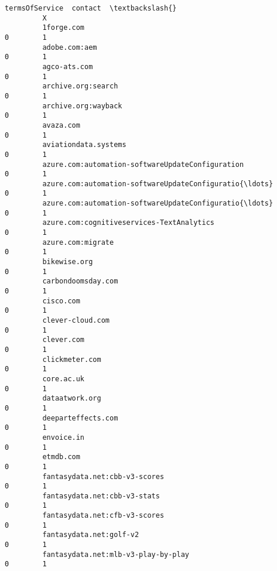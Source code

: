 \documentclass[11pt]{article}
\begin{document}
\begin{Verbatim}[commandchars=\\\{\}]
                                                             termsOfService  contact  \textbackslash{}
         X                                                                             
         1forge.com                                                       0        1   
         adobe.com:aem                                                    0        1   
         agco-ats.com                                                     0        1   
         archive.org:search                                               0        1   
         archive.org:wayback                                              0        1   
         avaza.com                                                        0        1   
         aviationdata.systems                                             0        1   
         azure.com:automation-softwareUpdateConfiguration                 0        1   
         azure.com:automation-softwareUpdateConfiguratio{\ldots}               0        1   
         azure.com:automation-softwareUpdateConfiguratio{\ldots}               0        1   
         azure.com:cognitiveservices-TextAnalytics                        0        1   
         azure.com:migrate                                                0        1   
         bikewise.org                                                     0        1   
         carbondoomsday.com                                               0        1   
         cisco.com                                                        0        1   
         clever-cloud.com                                                 0        1   
         clever.com                                                       0        1   
         clickmeter.com                                                   0        1   
         core.ac.uk                                                       0        1   
         dataatwork.org                                                   0        1   
         deeparteffects.com                                               0        1   
         envoice.in                                                       0        1   
         etmdb.com                                                        0        1   
         fantasydata.net:cbb-v3-scores                                    0        1   
         fantasydata.net:cbb-v3-stats                                     0        1   
         fantasydata.net:cfb-v3-scores                                    0        1   
         fantasydata.net:golf-v2                                          0        1   
         fantasydata.net:mlb-v3-play-by-play                              0        1   

\end{Verbatim}
\end{document}
